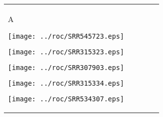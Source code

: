 \documentclass{minimal}
\renewcommand\big{\fontsize{10pt}{10pt}\selectfont}
\begin{document}
\begin{tabular}{lllll}

	\begin{minipage}[t][][t]{0.01cm} {\vspace{-2.00cm} \big\textsf{A}} \end{minipage}
	\begin{minipage}[b][][b]{2.01cm} {\centering \texttt{[image: ../roc/SRR545723.eps]}} \end{minipage} 
	\begin{minipage}[b][][b]{1.81cm} {\centering \texttt{[image: ../roc/SRR315323.eps]}} \end{minipage}
	\begin{minipage}[b][][b]{1.81cm} {\centering \texttt{[image: ../roc/SRR307903.eps]}} \end{minipage}
	\begin{minipage}[b][][b]{1.81cm} {\centering \texttt{[image: ../roc/SRR315334.eps]}} \end{minipage}
	\begin{minipage}[b][][b]{1.81cm} {\centering \texttt{[image: ../roc/SRR534307.eps]}} \end{minipage}\\



\end{tabular}
\end{document}
